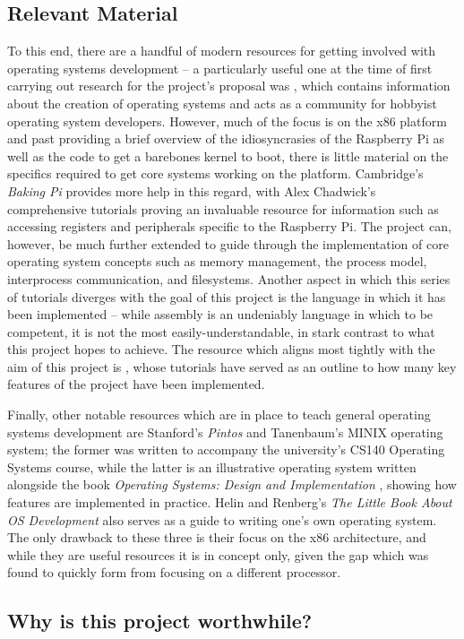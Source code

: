 \subsection{Relevant Material}
    To this end, there are a handful of modern resources for getting involved
    with operating systems development -- a particularly useful one at the time
    of first carrying out research for the project's proposal was
    , which contains information about the creation of
    operating systems and acts as a community for hobbyist operating system
    developers. However, much of the focus is on the x86 platform and past
    providing a brief overview of the idiosyncrasies of the Raspberry Pi as well
    as the code to get a barebones kernel to boot, there is little material on
    the specifics required to get core systems working on the platform.
    Cambridge's \textit{Baking Pi} \cite{BakingPi} provides more help in this
    regard, with Alex Chadwick's comprehensive tutorials proving an invaluable
    resource for information such as accessing registers and peripherals
    specific to the Raspberry Pi. The project can, however, be much further
    extended to guide through the implementation of core operating system
    concepts such as memory management, the process model, interprocess
    communication, and filesystems. Another aspect in which this series of
    tutorials diverges with the goal of this project is the language in which it
    has been implemented -- while assembly is an undeniably language in which to
    be competent, it is not the most easily-understandable, in stark contrast to
    what this project hopes to achieve. The resource which aligns most tightly
    with the aim of this project is \cite{jsandler}, whose tutorials have served
    as an outline to how many key features of the project have been implemented.
    
    Finally, other notable resources which are in place to teach general
    operating systems development are Stanford's \textit{Pintos} \cite{Pintos}
    and Tanenbaum's MINIX operating system; the former was written to accompany
    the university's CS140 Operating Systems course, while the latter is an
    illustrative operating system written alongside the book \textit{Operating
    Systems: Design and Implementation} \cite{MINIX}, showing how features are
    implemented in practice. Helin and Renberg's \textit{The Little Book About
    OS Development} \cite{littleosbook} also serves as a guide to writing one's
    own operating system. The only drawback to these three is their focus on the
    x86 architecture, and while they are useful resources it is in concept only,
    given the gap which was found to quickly form from focusing on a different
    processor.

\subsection{Why is this project worthwhile?}

